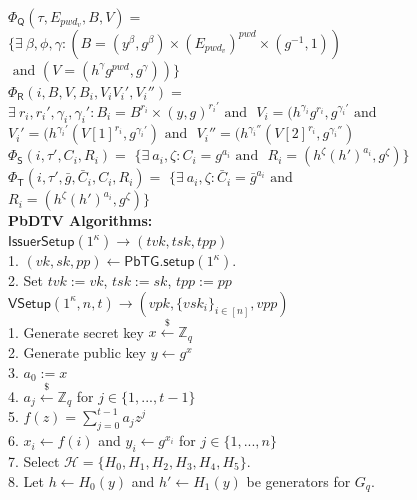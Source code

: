 \documentclass[conference]{IEEEtran}
\newcommand{\cH}{\mathcal{H}}
\newcommand{\cQ}{\mathsf{Q}}
\newcommand{\cR}{\mathsf{R}}
\newcommand{\cS}{\mathsf{S}}
\newcommand{\cT}{\mathsf{T}}
\newcommand{\secparameter}{\kappa}
\newcommand{\pwd}{pwd}
\newcommand{\sk}{sk}
\newcommand{\vk}{vk}
\newcommand{\pp}{pp}
\newcommand{\tvk}{tvk}
\newcommand{\tsk}{tsk}
\newcommand{\tpp}{tpp}
\newcommand{\vpk}{vpk}
\newcommand{\vsk}{vsk}
\newcommand{\vpp}{vpp}
\begin{document}
\begin{figure}
\begin{multicols}{2}
\raggedright
\scriptsize

\\

\noindent $\Phi_{\cQ}(\tau, E_{\pwd_{v}}, B, V) =$ $\{\exists~\beta, \phi, \gamma : (B = (y^{\beta}, g^{\beta}) \times (E_{\pwd_{v}})^{\pwd} \times (g^{-1}, 1))$ 
$\text{ and } (V = (h^{\gamma}g^{\pwd}, g^{\gamma}))\}$\\

\noindent $\Phi_{\cR}(i, B, V, B_{i}, V_{i} V_{i}', V_{i}'') =$ $\exists~ r_i, r_i', \gamma_i, \gamma_i' : B_i = B^{r_i} \times (y, g)^{r_i'} \text{ and }$ 
$V_i = (h^{\gamma_i}g^{r_i}, g^{\gamma_i'} \text{ and }$  
$V_i' = (h^{\gamma_i'}(V[1]^{r_i}, g^{\gamma_i'}) \text{ and }$ 
$V_i'' = (h^{\gamma_i''}(V[2]^{r_i},g^{\gamma_i''})$\\

\noindent $\Phi_{\cS}(i, \tau', C_i, R_i) =$ $\{\exists~ a_i, \zeta : C_i =g^{a_i} \text{ and }$ $R_i = (h^{\zeta}(h')^{a_i}, g^{\zeta})\}$\\

\noindent $\Phi_{\cT}(i, \tau', \bar{g}, \bar{C}_i, C_i, R_i) =$ $\{\exists~ a_i, \zeta : \bar{C}_i =\bar{g}^{a_i} \text{ and }$ $R_i = (h^{\zeta}(h')^{a_i}, g^{\zeta})\}$\\
{\bf PbDTV Algorithms:}\\
\noindent\underline{$\mathsf{IssuerSetup}(1^{\secparameter}) \rightarrow (\tvk,\tsk, \tpp)$}\\
1. $(\vk,\sk,\pp) \leftarrow \mathsf{PbTG}.\mathsf{setup}(1^{\secparameter})$.\\
2. Set $\tvk := \vk$, $\tsk := \sk$, $\tpp := \pp$\\

\noindent\underline{$\mathsf{VSetup}(1^{\secparameter}, n, t) \rightarrow (\vpk,\{\vsk_{i}\}_{i \in [n]}, \vpp)$}\\
1. Generate secret key $x \xleftarrow{\$} \mathbb{Z}_q$\\
2. Generate public key $y \leftarrow g^{x}$\\
3. $a_0 := x$\\
4. $a_j \xleftarrow{\$} \mathbb{Z}_q$ for $j \in \{1,...,t-1\}$\\
5. $f(z) = \sum^{t-1}_{j=0} a_j z^j$\\
6. $x_i \leftarrow f(i)$ and $y_i \leftarrow g^{x_i}$ for $j \in \{1,...,n\}$\\
7. Select $\cH = \{H_0,H_1,H_2,H_3,H_4,H_5\}$.\\
8. Let $h \leftarrow H_0(y)$ and $h' \leftarrow H_1(y)$ be generators for $G_q$.\\


\end{multicols}
\end{figure}
\end{document}

